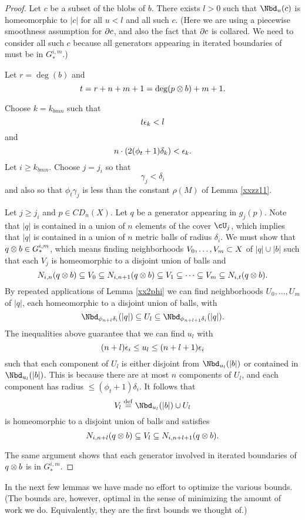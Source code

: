 \begin{proof}
Let $c$ be a subset of the blobs of $b$.
There exists $l > 0$ such that $\Nbd_u(c)$ is homeomorphic to $|c|$ for all $u < l$ 
and all such $c$.
(Here we are using a piecewise smoothness assumption for $\partial c$, and also
the fact that $\partial c$ is collared.
We need to consider all such $c$ because all generators appearing in
iterated boundaries of must be in $G_*^{i,m}$.)

Let $r = \deg(b)$ and 
\[
	t = r+n+m+1 = \deg(p\otimes b) + m + 1.
\]

Choose $k = k_{bmn}$ such that
\[
	t\epsilon_k < l
\]
and
\[
	n\cdot (2 (\phi_t + 1) \delta_k) < \epsilon_k .
\]
Let $i \ge k_{bmn}$.
Choose $j = j_i$ so that
\[
	\gamma_j < \delta_i
\]
and also so that $\phi_t \gamma_j$ is less than the constant $\rho(M)$ of Lemma \ref{xxzz11}.

Let $j \ge j_i$ and $p\in CD_n(X)$.
Let $q$ be a generator appearing in $g_j(p)$.
Note that $|q|$ is contained in a union of $n$ elements of the cover $\cU_j$,
which implies that $|q|$ is contained in a union of $n$ metric balls of radius $\delta_i$.
We must show that $q\otimes b \in G_*^{i,m}$, which means finding neighborhoods
$V_0,\ldots,V_m \subset X$ of $|q|\cup |b|$ such that each $V_j$
is homeomorphic to a disjoint union of balls and
\[
	N_{i,n}(q\otimes b) \subseteq V_0 \subseteq N_{i,n+1}(q\otimes b)
			\subseteq V_1 \subseteq \cdots \subseteq V_m \subseteq N_{i,t}(q\otimes b) .
\]
By repeated applications of Lemma \ref{xx2phi} we can find neighborhoods $U_0,\ldots,U_m$
of $|q|$, each homeomorphic to a disjoint union of balls, with
\[
	\Nbd_{\phi_{n+l} \delta_i}(|q|) \subeq U_l \subeq \Nbd_{\phi_{n+l+1} \delta_i}(|q|) .
\]
The inequalities above  guarantee that we can find $u_l$ with 
\[
	(n+l)\epsilon_i \le u_l \le (n+l+1)\epsilon_i
\]
such that each component of $U_l$ is either disjoint from $\Nbd_{u_l}(|b|)$ or contained in 
$\Nbd_{u_l}(|b|)$.
This is because there are at most $n$ components of $U_l$, and each component
has radius $\le (\phi_t + 1) \delta_i$.
It follows that
\[
	V_l \deq \Nbd_{u_l}(|b|) \cup U_l
\]
is homeomorphic to a disjoint union of balls and satisfies
\[
	N_{i,n+l}(q\otimes b) \subseteq V_l \subseteq N_{i,n+l+1}(q\otimes b) .
\]

The same argument shows that each generator involved in iterated boundaries of $q\otimes b$
is in $G_*^{i,m}$.
\end{proof}

In the next few lemmas we have made no effort to optimize the various bounds.
(The bounds are, however, optimal in the sense of minimizing the amount of work
we do.  Equivalently, they are the first bounds we thought of.)

